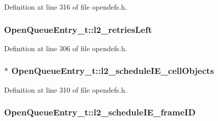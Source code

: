 Definition at line 316 of file opendefs.\+h.

\subsubsection[{\texorpdfstring{l2\+\_\+retries\+Left}{l2_retriesLeft}}]{ Open\+Queue\+Entry\+\_\+t\+::l2\+\_\+retries\+Left}\hypertarget{struct_open_queue_entry__t_a995ab5a1246bdcb9612655399041b8ec}{}\label{struct_open_queue_entry__t_a995ab5a1246bdcb9612655399041b8ec}


Definition at line 306 of file opendefs.\+h.

\subsubsection[{\texorpdfstring{l2\+\_\+schedule\+I\+E\+\_\+cell\+Objects}{l2_scheduleIE_cellObjects}}]{$\ast$ Open\+Queue\+Entry\+\_\+t\+::l2\+\_\+schedule\+I\+E\+\_\+cell\+Objects}\hypertarget{struct_open_queue_entry__t_a7b215aaeb65deefac11cbf58398d465a}{}\label{struct_open_queue_entry__t_a7b215aaeb65deefac11cbf58398d465a}


Definition at line 310 of file opendefs.\+h.

\subsubsection[{\texorpdfstring{l2\+\_\+schedule\+I\+E\+\_\+frame\+ID}{l2_scheduleIE_frameID}}]{ Open\+Queue\+Entry\+\_\+t\+::l2\+\_\+schedule\+I\+E\+\_\+frame\+ID}\hypertarget{struct_open_queue_entry__t_ab09f23d7e68a32721a08e7263cd776ed}{}\label{struct_open_queue_entry__t_ab09f23d7e68a32721a08e7263cd776ed}


